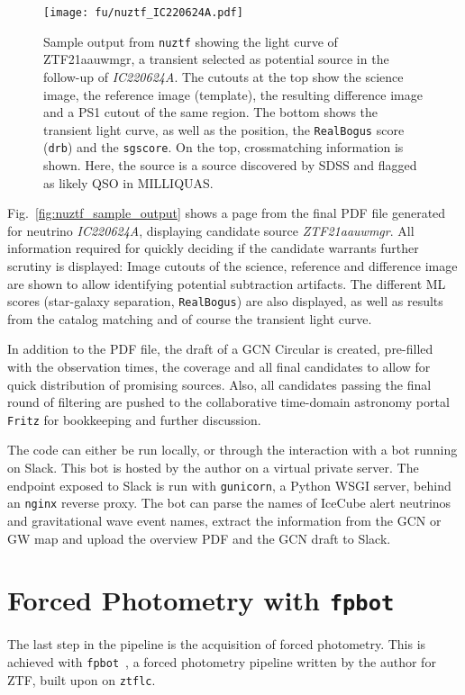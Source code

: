 \begin{figure}[h!]
    \texttt{[image: fu/nuztf\_IC220624A.pdf]}
    \caption[\texttt{nuztf} output]{Sample output from \texttt{nuztf} showing the light curve of ZTF21aauwmgr, a transient selected as potential source in the follow-up of \textit{IC220624A}. The cutouts at the top show the science image, the reference image (template), the resulting difference image and a PS1 cutout of the same region. The bottom shows the transient light curve, as well as the position, the \texttt{RealBogus} score (\texttt{drb}) and the \texttt{sgscore}. On the top, crossmatching information is shown. Here, the source is a source discovered by SDSS and flagged as likely QSO in MILLIQUAS.}
\end{figure}

Fig.~\ref{fig:nuztf_sample_output} shows a page from the final PDF file generated for neutrino \textit{IC220624A}, displaying candidate source \textit{ZTF21aauwmgr}. All information required for quickly deciding if the candidate warrants further scrutiny is displayed: Image cutouts of the science, reference and difference image are shown to allow identifying potential subtraction artifacts. The different ML scores (star-galaxy separation, \texttt{RealBogus}) are also displayed, as well as results from the catalog matching and of course the transient light curve.

In addition to the PDF file, the draft of a GCN Circular is created, pre-filled with the observation times, the coverage and all final candidates to allow for quick distribution of promising sources. Also, all candidates passing the final round of filtering are pushed to the collaborative time-domain astronomy portal \texttt{Fritz} for bookkeeping and further discussion.

The code can either be run locally, or through the interaction with a bot running on Slack. This bot is hosted by the author on a virtual private server. The endpoint exposed to Slack is run with \texttt{gunicorn}, a Python WSGI server, behind an \texttt{nginx} reverse proxy. The bot can parse the names of IceCube alert neutrinos and gravitational wave event names, extract the information from the GCN or GW map and upload the overview PDF and the GCN draft to Slack.

\section{Forced Photometry with \texttt{fpbot}}\label{fpbot}
The last step in the pipeline is the acquisition of forced photometry. This is achieved with \texttt{fpbot}~, a forced photometry pipeline written by the author for ZTF, built upon on \texttt{ztflc}.

